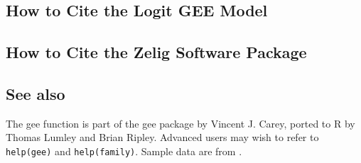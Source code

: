 \subsection*{How to Cite the Logit GEE Model}

\subsection*{How to Cite the Zelig Software Package}
\CiteZelig

\subsection*{See also}
The gee function is part of the gee package by Vincent J. Carey, ported to R by Thomas Lumley and Brian Ripley.  Advanced users may wish to refer to \texttt{help(gee)} and \texttt{help(family)}.  Sample data are from \cite{KinTomWit00}.






